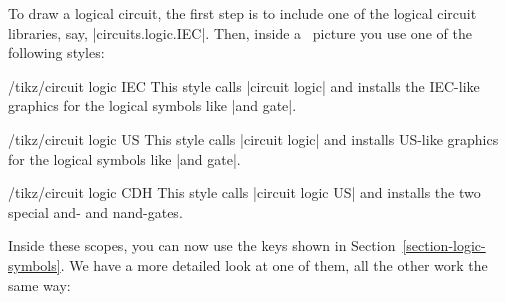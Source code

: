 To draw a logical circuit, the first step is to include one of the
logical circuit libraries, say, |circuits.logic.IEC|. Then, inside a
\tikzname\ picture you use one of the following styles:

\begin{key}{/tikz/circuit logic IEC}
  This style calls |circuit logic| and installs the IEC-like
  graphics for the logical symbols like |and gate|.
\end{key}
\begin{key}{/tikz/circuit logic US}
  This style calls |circuit logic| and installs US-like graphics 
  for the logical symbols like |and gate|.
\end{key}
\begin{key}{/tikz/circuit logic CDH}
  This style calls |circuit logic US| and installs the two special
  and- and nand-gates.
\end{key}

Inside these scopes, you can now use the keys shown in
Section~\ref{section-logic-symbols}. We have a more detailed look at
one of them, all the other work the same way:

